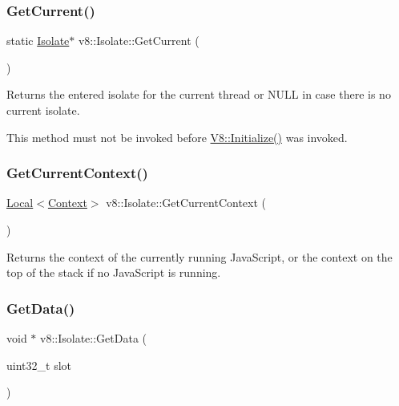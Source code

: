 \subsubsection{\texorpdfstring{Get\+Current()}{GetCurrent()}}
{\footnotesize\ttfamily static \mbox{\hyperlink{classv8_1_1Isolate}{Isolate}}$\ast$ v8\+::\+Isolate\+::\+Get\+Current (\begin{DoxyParamCaption}{ }\end{DoxyParamCaption})\hspace{0.3cm}{\ttfamily [static]}}

Returns the entered isolate for the current thread or N\+U\+LL in case there is no current isolate.

This method must not be invoked before \mbox{\hyperlink{classv8_1_1V8_a40daec93ce44bdd922567fc121be9db8}{V8\+::\+Initialize()}} was invoked. \mbox{\label{classv8_1_1Isolate_afa1b6cde5a7a7cfde87eaabc4ab34062}} 
\subsubsection{\texorpdfstring{Get\+Current\+Context()}{GetCurrentContext()}}
{\footnotesize\ttfamily \mbox{\hyperlink{classv8_1_1Local}{Local}}$<$\mbox{\hyperlink{classv8_1_1Context}{Context}}$>$ v8\+::\+Isolate\+::\+Get\+Current\+Context (\begin{DoxyParamCaption}{ }\end{DoxyParamCaption})}

Returns the context of the currently running Java\+Script, or the context on the top of the stack if no Java\+Script is running. \mbox{\label{classv8_1_1Isolate_aed85b3c82bf69a60ecebc2558ab95083}} 
\subsubsection{\texorpdfstring{Get\+Data()}{GetData()}}
{\footnotesize\ttfamily void $\ast$ v8\+::\+Isolate\+::\+Get\+Data (\begin{DoxyParamCaption}\item[{uint32\+\_\+t}]{slot }\end{DoxyParamCaption})}

